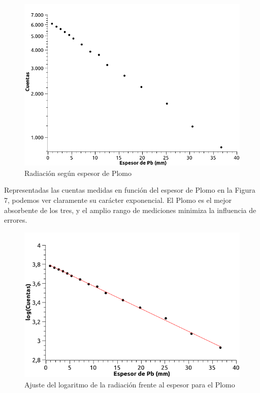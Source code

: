 \documentclass[a4paper,12pt,spanish]{article}
\begin{document}
	\begin{figure}[H]
		\centering
		\includegraphics[width=0.9\linewidth]{images/graficas_practica_4/plomo_cuentas}
		\caption{Radiación según espesor de Plomo}
		\label{fig:plomocuentas}
	\end{figure}
	
	
	
	Representadas las cuentas medidas en función del espesor de Plomo en la Figura 7, podemos ver claramente su carácter exponencial. El Plomo es el mejor absorbente de los tres, y el amplio rango de mediciones minimiza la influencia de errores.
	
	\begin{figure}[H]
		\centering
		\includegraphics[width=0.7\linewidth]{images/graficas_practica_4/plomo_ajuste}
		\caption{Ajuste del logaritmo de la radiación frente al espesor para el Plomo}
		\label{fig:plomoajuste}
	\end{figure}
	
	
	
	
	
	
	
\end{document}
